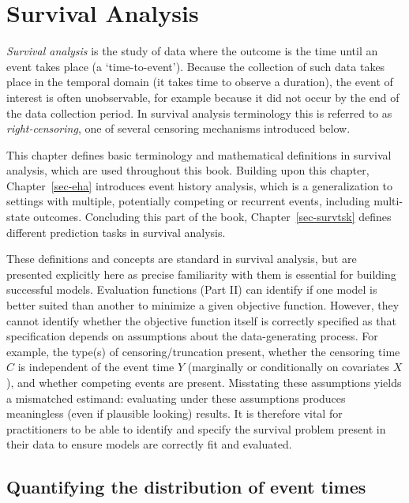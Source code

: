 \documentclass[
  letterpaper,
  krantz2]{style/krantz}
\begin{document}
\chapter{Survival Analysis}\label{sec-surv}

\emph{Survival analysis} is the study of data
where the outcome is the time until an event takes place (a
`time-to-event'). Because the collection of such data takes place in the
temporal domain (it takes time to observe a duration), the event of
interest is often unobservable, for example because it did not occur by
the end of the data collection period. In survival analysis terminology
this is referred to as \emph{right-censoring},
one of several censoring mechanisms introduced below.

This chapter defines basic terminology and mathematical definitions in
survival analysis, which are used throughout this book. Building upon
this chapter, Chapter~\ref{sec-eha} introduces event history
analysis, which is a generalization to
settings with multiple, potentially competing or recurrent
events, including
multi-state outcomes. Concluding this part of
the book, Chapter~\ref{sec-survtsk} defines different prediction
tasks in survival analysis.

These definitions and concepts are standard in survival analysis, but
are presented explicitly here as precise familiarity with them is
essential for building successful models. Evaluation
functions (Part II) can identify if one model is
better suited than another to minimize a given objective function.
However, they cannot identify whether the objective function itself is
correctly specified as that specification depends on assumptions about
the data-generating process. For example, the type(s) of
censoring/truncation present, whether
the censoring time \(C\) is independent of the event time \(Y\)
(marginally or conditionally on covariates \(X\)), and whether competing
events are present. Misstating these assumptions yields a mismatched
estimand: evaluating under these assumptions produces meaningless (even
if plausible looking) results. It is therefore vital for practitioners
to be able to identify and specify the survival problem present in their
data to ensure models are correctly fit and evaluated.

\section{Quantifying the distribution of event
times}\label{sec-distributions}
\end{document}
